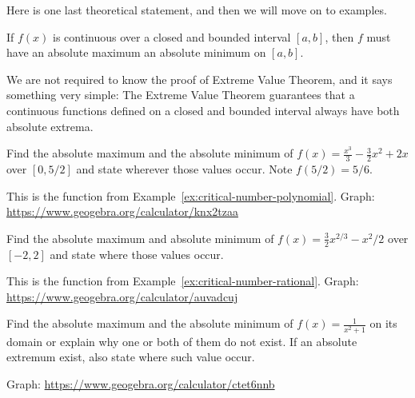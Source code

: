 \documentclass[../main.tex]{subfiles}
\begin{document}
\medskip{}
Here is one last theoretical statement, and then we will move on to examples. 

\begin{mdframed}[style=withref-compact]
  If \(f(x)\) is continuous over a closed and bounded interval \([a,b]\), then \(f\) must have an absolute maximum  an absolute minimum on \([a,b]\).

\end{mdframed}
We are not required to know the proof of Extreme Value Theorem, and it says something very simple: The Extreme Value Theorem guarantees that a continuous functions defined on a closed and bounded interval always have both absolute extrema.
\clearpage

\begin{example} \label{ex:closed-interval-method-intro}
  Find the absolute maximum and the absolute minimum of \(f(x) = \frac{x^{3}}{3} - \frac{3}{2}x^{2} + 2x\) over \([0,5/2]\) and state wherever those values occur. Note \(f(5/2) = 5/6\).

  This is the function from Example~\ref{ex:critical-number-polynomial}. Graph: \url{https://www.geogebra.org/calculator/knx2tzaa}

\end{example}

\begin{example} 
  Find the absolute maximum and absolute minimum of \(f(x) = \frac{3}{2} x^{2/3} - x^{2}/2\) over \([-2,2]\) and state where those values occur.

  This is the function from Example~\ref{ex:critical-number-rational}. Graph: \url{https://www.geogebra.org/calculator/auvadcuj}

\end{example}
\clearpage

\begin{example} \label{ex:extremum-open-interval}
  Find the absolute maximum and the absolute minimum of \(f(x) = \frac{1}{x^{2}+1}\) on its domain or explain why one or both of them do not exist. If an absolute extremum exist, also state where such value occur.

  Graph: \url{https://www.geogebra.org/calculator/ctet6nnb}

\end{example}
\end{document}
